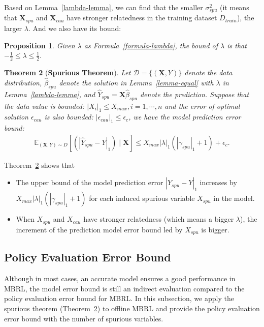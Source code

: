 \documentclass{article}
\theoremstyle{plain}
\newtheorem{theorem}{Theorem}[section]
\newtheorem{proposition}[theorem]{Proposition}
\theoremstyle{definition}
\theoremstyle{remark}
\begin{document}
Based on Lemma~\ref{lambda-lemma}, we can find that the smaller  $\sigma^2_{spu}$ (it means that $\textbf{X}_{spu}$ and $\textbf{X}_{cau}$ have stronger relatedness in the training dataset $D_{train}$), the larger $\lambda$. 
And we also have its bound:
\begin{proposition}
Given $\lambda$ as Formula~\ref{formula-lambda}, the bound of $\lambda$ is that
$
-\frac{1}{2}\leq\lambda\leq\frac{1}{2}.
$
\end{proposition}       


\begin{theorem}[\textbf{Spurious Theorem}]
\label{theorem-spurious}
Let $\mathcal{D}=\{(\textbf{X},Y)\}$ denote the data distribution, $\hat{\beta}_{spu}$ denote the solution in Lemma~\ref{lemma-equal} with $\lambda$ in Lemma~\ref{lambda-lemma},
and $\hat{Y}_{spu}=\textbf{X}\hat{\beta}_{spu}$ denote the prediction.
Suppose that the data value is bounded: $|X_i|_1 \leq X_{max}, i=1,\cdots,n$ and the error of optimal solution $\epsilon_{cau}$ is also bounded: $|\epsilon_{cau}|_1\leq\epsilon_c$, we have the model prediction error bound:
\begin{align}
\mathbb{E}_{(\textbf{X},Y)\sim D}[(|\hat{Y}_{spu}-Y|_1)\mid \textbf{X}]\leq X_{max}|\lambda|_1(|\gamma_{spu}|_1+1)+\epsilon_{c}.
\end{align}
\end{theorem}
Theorem~\ref{theorem-spurious} shows that 
\begin{itemize}[leftmargin=5mm]
    \item The upper bound of the model prediction error $|\hat{Y}_{spu}-Y|_1$ increases by $X_{max}|\lambda|_1(|\gamma_{spu}|_1+1)$ for each induced spurious variable $X_{spu}$ in the model.
    \item When $X_{spu}$ and $X_{cau}$ have stronger relatedness (which means a bigger $\lambda$), the increment of the prediction model error bound led by $X_{spu}$ is bigger.
\end{itemize}



\subsection{Policy Evaluation Error Bound}

Although in most cases, an accurate model ensures a good performance in MBRL, the model error bound is still an indirect evaluation compared to the policy evaluation error bound for MBRL.
In this subsection, we apply the spurious theorem (Theorem~\ref{theorem-spurious}) to offline MBRL and provide the policy evaluation error bound with the number of spurious variables.
\end{document}
